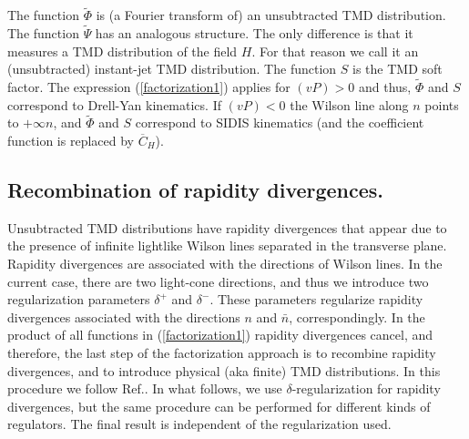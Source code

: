 \documentclass[a4paper, amsfonts, amssymb, amsmath, reprint, showkeys, nofootinbib, twoside]{revtex4-1}
\renewcommand{\(}{\left(}
\renewcommand{\)}{\right)}
\renewcommand{\[}{\left[}
\renewcommand{\]}{\right]}
\begin{document}
The function $\widetilde \Phi$ is (a Fourier transform of) an unsubtracted TMD distribution. The function $\widetilde{\Psi}$ has an analogous structure. The only difference is that it measures a TMD distribution of the field $H$. For that reason we call it an (unsubtracted) instant-jet TMD distribution. The function $S$ is the TMD soft factor. The expression (\ref{factorization1}) applies for $(vP)>0$ and thus, $\widetilde \Phi$ and $S$ correspond to Drell-Yan kinematics. If $(vP)<0$ the Wilson line along $n$ points to $+\infty n$, and $\widetilde \Phi$ and $S$ correspond to SIDIS kinematics (and the coefficient function is replaced by $\overline{C}_H$).


\subsection{Recombination of rapidity divergences.} 

Unsubtracted TMD distributions have rapidity divergences that appear due to the presence of infinite lightlike Wilson lines separated in the transverse plane. Rapidity divergences are associated with the directions of Wilson lines. In the current case, there are two light-cone directions, and thus we introduce two regularization parameters $\delta^+$ and $\delta^-$. These parameters regularize rapidity divergences associated with the directions $n$ and $\bar n$, correspondingly. In the product of all functions in (\ref{factorization1}) rapidity divergences cancel, and therefore, the last step of the factorization approach is to recombine rapidity divergences, and to introduce physical (aka finite) TMD distributions. In this procedure we follow Ref.\cite{Vladimirov:2017ksc}. In what follows, we use $\delta$-regularization for rapidity divergences, but the same procedure can be performed for different kinds of regulators. The final result is independent of the regularization used.
\end{document}
